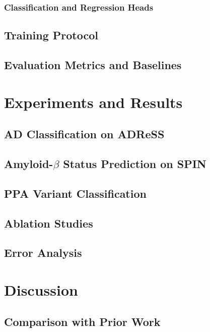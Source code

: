 \documentclass[a4paper,12pt]{article}
\begin{document}
\subsubsection{Classification and Regression Heads}

\subsection{Training Protocol}

\subsection{Evaluation Metrics and Baselines}

\clearpage
\section{Experiments and Results}

\subsection{AD Classification on ADReSS}

\subsection{Amyloid-\texorpdfstring{$\beta$}{beta} Status Prediction on SPIN}

\subsection{PPA Variant Classification}

\subsection{Ablation Studies}

\subsection{Error Analysis}

\clearpage
\section{Discussion}

\subsection{Comparison with Prior Work}
\end{document}
